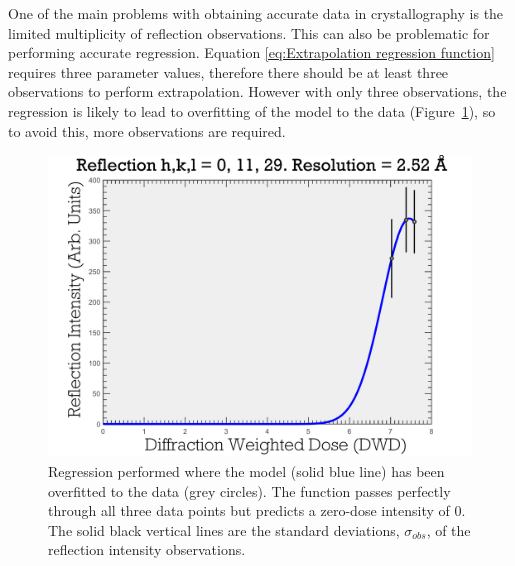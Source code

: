 One of the main problems with obtaining accurate data in crystallography is the limited multiplicity of reflection observations.
This can also be problematic for performing accurate regression.
Equation \ref{eq:Extrapolation regression function} requires three parameter values, therefore there should be at least three observations to perform extrapolation.
However with only three observations, the regression is likely to lead to overfitting of the model to the data (Figure~\ref{fig:Data Overfitting to few data points - Extrapolation method}), so to avoid this, more observations are required.
\begin{figure}
  \centering
    \includegraphics[width=1\textwidth]{figures/zde/ReflectionPlot_h,k,l_0,11,29-3obs.pdf}
    \caption{Regression performed where the model (solid blue line) has been overfitted to the data (grey circles).
    The function passes perfectly through all three data points but predicts a zero-dose intensity of 0.
    The solid black vertical lines are the standard deviations, $\sigma_{obs}$, of the reflection intensity observations.}
    \label{fig:Data Overfitting to few data points - Extrapolation method}
\end{figure}

